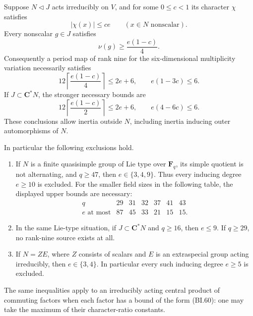 \begin{theorem}
\label{D-BI-18}
Suppose $N\triangleleft J$ acts irreducibly on $V$, and for some
$0\le c<1$ its character $\chi$ satisfies
\[
          |\chi(x)|\le c e\qquad(x\in N\text{ nonscalar}).       \tag{BI.60}
\]
Every nonscalar $g\in J$ satisfies
\[
                         \nu(g)\ge\frac{e(1-c)}4.              \tag{BI.61}
\]
Consequently a period map of rank nine for the six-dimensional
multiplicity variation necessarily satisfies
\[
       12\left\lceil\frac{e(1-c)}4\right\rceil\le2e+6,
       \qquad e(1-3c)\le6.                                   \tag{BI.62}
\]
If $J\subset\mathbf C^*N$, the stronger necessary bounds are
\[
       12\left\lceil\frac{e(1-c)}2\right\rceil\le2e+6,
       \qquad e(4-6c)\le6.                                   \tag{BI.63}
\]
These conclusions allow inertia outside $N$, including inertia
inducing outer automorphisms of $N$.

In particular the following exclusions hold.
\begin{enumerate}
\item If $N$ is a finite quasisimple group of Lie type over
$\mathbf F_q$, its simple quotient is not alternating, and $q\ge47$,
then $e\in\{3,4,9\}$.  Thus every inducing degree $e\ge10$ is
excluded.  For the smaller field sizes in the following table, the
displayed upper bounds are necessary:
\[
\begin{array}{c|rrrrrr}
q&29&31&32&37&41&43\\ \hline
e\text{ at most}&87&45&33&21&15&15.
\end{array}                                                   \tag{BI.64}
\]
\item In the same Lie-type situation, if $J\subset\mathbf C^*N$
and $q\ge16$, then $e\le9$.  If $q\ge29$, no rank-nine source
exists at all.
\item If $N=ZE$, where $Z$ consists of scalars and $E$ is an
extraspecial group acting irreducibly, then $e\in\{3,4\}$.
In particular every such inducing degree $e\ge5$ is excluded.
\end{enumerate}
The same inequalities apply to an irreducibly acting central product
of commuting factors when each factor has a bound of the form
(BI.60): one may take the maximum of their character-ratio constants.
\end{theorem}

